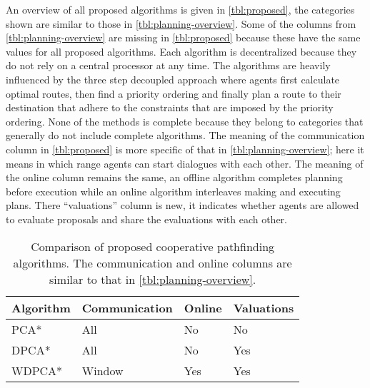 An overview of all proposed algorithms is given in \autoref{tbl:proposed}, the
categories shown are similar to those in \autoref{tbl:planning-overview}. Some
of the columns from \autoref{tbl:planning-overview} are missing in
\autoref{tbl:proposed} because these have the same values for all proposed
algorithms. Each algorithm is decentralized because they do not rely on a
central processor at any time. The algorithms are heavily influenced by the
three step decoupled approach where agents first calculate optimal routes, then
find a priority ordering and finally plan a route to their destination that
adhere to the constraints that are imposed by the priority ordering. None of
the methods is complete because they belong to categories that generally do not
include complete algorithms. The meaning of the communication column in
\autoref{tbl:proposed} is more specific of that in
\autoref{tbl:planning-overview}; here it means in which range agents can start
dialogues with each other. The meaning of the online column remains the same,
an offline algorithm completes planning before execution while an online
algorithm interleaves making and executing plans. There ``valuations'' column
is new, it indicates whether agents are allowed to evaluate proposals and share
the evaluations with each other.

\begin{table}
    \centering
    \caption{Comparison of proposed cooperative pathfinding algorithms. The
    communication and online columns are similar to that in
    \autoref{tbl:planning-overview}.}
    \label{tbl:proposed}
    \begin{tabular}{l|l|l|l}
        Algorithm & Communication & Online & Valuations \\ \hline
        PCA*   & All & No & No \\
        DPCA*  & All & No & Yes \\
        WDPCA* & Window & Yes & Yes \\
    \end{tabular}
\end{table}